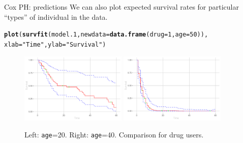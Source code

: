 \documentclass[12pt,english,pdf,xcolor=dvipsnames,aspectratio=169,handout]{beamer}\usepackage[]{graphicx}\usepackage[]{xcolor}
\makeatletter
\newcommand{\hlnum}[1]{\textcolor[rgb]{0.686,0.059,0.569}{#1}}%
\newcommand{\hlstr}[1]{\textcolor[rgb]{0.192,0.494,0.8}{#1}}%
\newcommand{\hlstd}[1]{\textcolor[rgb]{0.345,0.345,0.345}{#1}}%
\newcommand{\hlkwc}[1]{\textcolor[rgb]{0.333,0.667,0.333}{#1}}%
\newcommand{\hlkwd}[1]{\textcolor[rgb]{0.737,0.353,0.396}{\textbf{#1}}}%
\newenvironment{kframe}{%
 \def\at@end@of@kframe{}%
 \ifinner\ifhmode%
  \def\at@end@of@kframe{\end{minipage}}%
  \begin{minipage}{\columnwidth}%
 \fi\fi%
 \def\FrameCommand##1{\hskip\@totalleftmargin \hskip-\fboxsep
 \colorbox{shadecolor}{##1}\hskip-\fboxsep
     \hskip-\linewidth \hskip-\@totalleftmargin \hskip\columnwidth}%
 \MakeFramed {\advance\hsize-\width
   \@totalleftmargin\z@ \linewidth\hsize
   \@setminipage}}%
 {\par\unskip\endMakeFramed%
 \at@end@of@kframe}
\newenvironment{knitrout}{}{} %
\makeatother
\begin{document}
\begin{frame}[fragile]{Cox PH: predictions}
We can also plot expected survival rates for particular ``types'' of individual in the data.\bigskip





\begin{knitrout}\scriptsize
{}\color{fgcolor}\begin{kframe}
\begin{alltt}
\hlkwd{plot}\hlstd{(}\hlkwd{survfit}\hlstd{(model.1,} \hlkwc{newdata} \hlstd{=} \hlkwd{data.frame}\hlstd{(}\hlkwc{drug} \hlstd{=} \hlnum{1}\hlstd{,} \hlkwc{age} \hlstd{=} \hlnum{50}\hlstd{)),}
     \hlkwc{xlab} \hlstd{=} \hlstr{"Time"}\hlstd{,} \hlkwc{ylab} \hlstd{=} \hlstr{"Survival"}\hlstd{)}
\end{alltt}
\end{kframe}
\end{knitrout}

\begin{figure}
\centering
\includegraphics[width=0.45\textwidth]{../03-graphs/02-01}
\includegraphics[width=0.45\textwidth]{../03-graphs/02-02}
\caption*{Left: \texttt{age}=20. Right: \texttt{age}=40. Comparison for drug users.}
\end{figure}
\end{frame}
\end{document}
